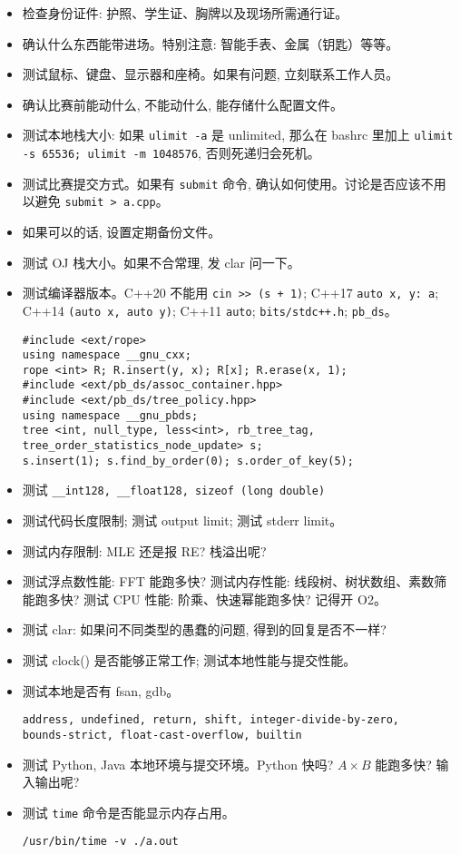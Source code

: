 \begin{small}
\begin{itemize}[leftmargin=1mm]
    \setlength{\itemsep}{0pt}
    \setlength{\parskip}{0.5pt}
    \item 检查身份证件: 护照、学生证、胸牌以及现场所需通行证。
    \item 确认什么东西能带进场。特别注意: 智能手表、金属（钥匙）等等。
    \item 测试鼠标、键盘、显示器和座椅。如果有问题, 立刻联系工作人员。
    \item 确认比赛前能动什么, 不能动什么, 能存储什么配置文件。
    \item 测试本地栈大小: 如果 \texttt{ulimit -a} 是 unlimited, 那么在 bashrc 里加上 \texttt{ulimit -s 65536; ulimit -m 1048576}, 否则死递归会死机。
    \item 测试比赛提交方式。如果有 \texttt{submit} 命令, 确认如何使用。讨论是否应该不用以避免 \texttt{submit > a.cpp}。
    \item 如果可以的话, 设置定期备份文件。
    \item 测试 OJ 栈大小。如果不合常理, 发 clar 问一下。
    \item 测试编译器版本。C++20 不能用 \texttt{cin >> (s + 1)}; C++17 \texttt{auto \lbrack x, y\rbrack : a}; C++14 \texttt{\lbrack \rbrack (auto x, auto y)}; C++11 \texttt{auto}; \texttt{bits/stdc++.h}; \texttt{pb\_ds}。
\begin{verbatim}
#include <ext/rope>
using namespace __gnu_cxx;
rope <int> R; R.insert(y, x); R[x]; R.erase(x, 1);
#include <ext/pb_ds/assoc_container.hpp> 
#include <ext/pb_ds/tree_policy.hpp> 
using namespace __gnu_pbds;
tree <int, null_type, less<int>, rb_tree_tag,
tree_order_statistics_node_update> s;
s.insert(1); s.find_by_order(0); s.order_of_key(5);
\end{verbatim}
    \item 测试 \texttt{\_\_int128, \_\_float128, sizeof (long double)}
    \item 测试代码长度限制; 测试 output limit; 测试 stderr limit。
    \item 测试内存限制: MLE 还是报 RE? 栈溢出呢? 
    \item 测试浮点数性能: FFT 能跑多快? 测试内存性能: 线段树、树状数组、素数筛能跑多快? 测试 CPU 性能: 阶乘、快速幂能跑多快? 记得开 O2。
    \item 测试 clar: 如果问不同类型的愚蠢的问题, 得到的回复是否不一样? 
    \item 测试 clock() 是否能够正常工作; 测试本地性能与提交性能。
    \item 测试本地是否有 fsan, gdb。\begin{verbatim}
address, undefined, return, shift, integer-divide-by-zero,
bounds-strict, float-cast-overflow, builtin
\end{verbatim}
    \item 测试 Python, Java 本地环境与提交环境。Python 快吗? $A\times B$ 能跑多快? 输入输出呢? 
    \item 测试 \texttt{time} 命令是否能显示内存占用。
\begin{verbatim}
/usr/bin/time -v ./a.out
\end{verbatim}
\end{itemize}
\end{small}
